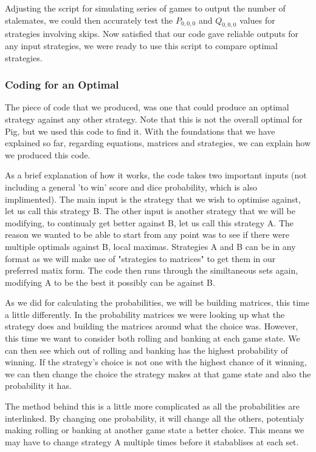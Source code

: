 \documentclass[a4paper,titlepage]{article}
\begin{document}
Adjusting the script for simulating series of games to output the number of stalemates, we could then accurately test the $P_{0,0,0}$ and $Q_{0,0,0}$ values for strategies involving skips. Now satisfied that our code gave reliable outputs for any input strategies, we were ready to use this script to compare optimal strategies.

\subsubsection{Coding for an Optimal}

The piece of code that we produced, was one that could produce an optimal strategy against any other strategy. Note that this is not the overall optimal for Pig, but we used this code to find it. With the foundations that we have explained so far, regarding equations, matrices and strategies, we can explain how we produced this code.

As a brief explanation of how it works, the code takes two important inputs (not including a general 'to win' score and dice probability, which is also implimented). The main input is the strategy that we wish to optimise against, let us call this strategy B. The other input is another strategy that we will be modifying, to continualy get better against B, let us call this strategy A. The reason we wanted to be able to start from any point was to see if there were multiple optimals against B, local maximas. Strategies A and B can be in any format as we will make use of "strategies to matrices" to get them in our preferred matix form. The code then runs through the similtaneous sets again, modifying A to be the best it possibly can be against B.

As we did for calculating the probabilities, we will be building matrices, this time a little differently. In the probability matrices we were looking up what the strategy does and building the matrices around what the choice was. However, this time we want to consider both rolling and banking at each game state. We can then see which out of rolling and banking has the highest probability of winning. If the strategy's choice is not one with the highest chance of it winning, we can then change the choice the strategy makes at that game state and also the probability it has.

The method behind this is a little more complicated as all the probabilities are interlinked. By changing one probability, it will change all the others, potentialy making rolling or banking at another game state a better choice. This means we may have to change strategy A multiple times before it stabablises at each set.
\end{document}
